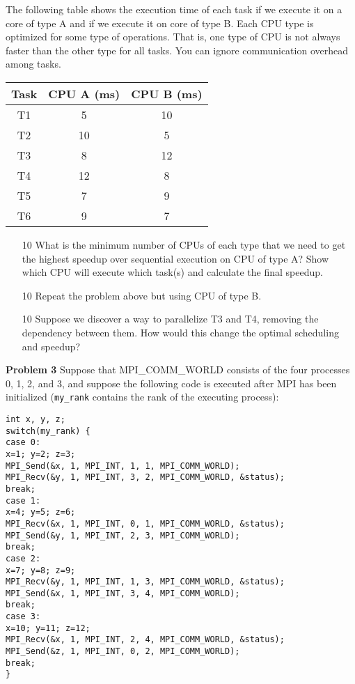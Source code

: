 \documentclass{article}
\begin{document}
The following table shows the execution time of each task if we execute it on a core of type A and if we execute it on core of type B. Each CPU type is optimized for some type of operations. That is, one type of CPU is not always faster than the other type for all tasks. You can ignore communication overhead among tasks.

\begin{tabular}{|c|c|c|}
\hline
Task & CPU A (ms) & CPU B (ms) \\
\hline
T1 & 5 & 10 \\
T2 & 10 & 5 \\
T3 & 8 & 12 \\
T4 & 12 & 8 \\
T5 & 7 & 9 \\
T6 & 9 & 7 \\
\hline
\end{tabular}

\begin{enumerate}
    \item [10] What is the minimum number of CPUs of each type that we need to get the highest speedup over sequential execution on CPU of type A? Show which CPU will execute which task(s) and calculate the final speedup.
    \item [10] Repeat the problem above but using CPU of type B.
    \item [10]  Suppose we discover a way to parallelize T3 and T4, removing the dependency between them. How would this change the optimal scheduling and speedup?
\end{enumerate}

\textbf{Problem 3}
Suppose that MPI\_COMM\_WORLD consists of the four processes 0, 1, 2, and 3, and suppose the following code is executed after MPI has been initialized (\texttt{my\_rank} contains the rank of the executing process):

\begin{verbatim}
int x, y, z;
switch(my_rank) {
case 0:
x=1; y=2; z=3;
MPI_Send(&x, 1, MPI_INT, 1, 1, MPI_COMM_WORLD);
MPI_Recv(&y, 1, MPI_INT, 3, 2, MPI_COMM_WORLD, &status);
break;
case 1:
x=4; y=5; z=6;
MPI_Recv(&x, 1, MPI_INT, 0, 1, MPI_COMM_WORLD, &status);
MPI_Send(&y, 1, MPI_INT, 2, 3, MPI_COMM_WORLD);
break;
case 2:
x=7; y=8; z=9;
MPI_Recv(&y, 1, MPI_INT, 1, 3, MPI_COMM_WORLD, &status);
MPI_Send(&x, 1, MPI_INT, 3, 4, MPI_COMM_WORLD);
break;
case 3:
x=10; y=11; z=12;
MPI_Recv(&x, 1, MPI_INT, 2, 4, MPI_COMM_WORLD, &status);
MPI_Send(&z, 1, MPI_INT, 0, 2, MPI_COMM_WORLD);
break;
}
\end{verbatim}
\end{document}

